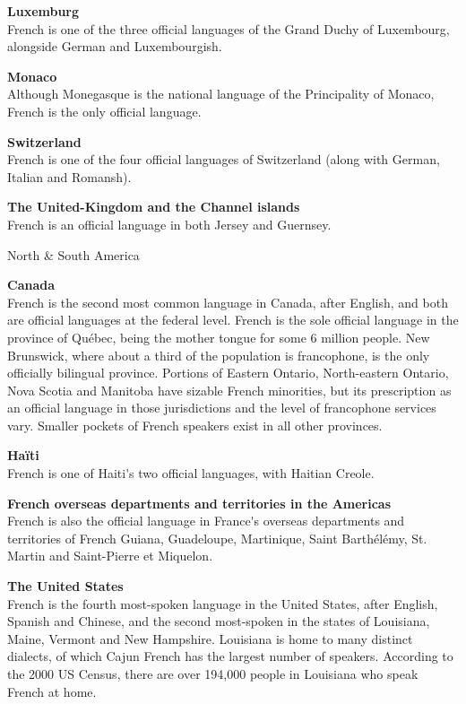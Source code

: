 \begin{multicols}{2}
{\bf Luxemburg}\\
French is one of the three official languages of the Grand Duchy of Luxembourg, alongside German and Luxembourgish.

{\bf Monaco}\\ 
Although Monegasque is the national language of the Principality of
Monaco, French is the only official language.

{\bf Switzerland}\\
French is one of the four official languages of Switzerland (along with German, Italian and Romansh).

{\bf The United-Kingdom and the Channel islands}\\
French is an official language in both Jersey and Guernsey.

\begin{center}
{\sc North \& South America}
\end{center}

{\bf Canada}\\
French is the second most common language in Canada, after English,
and both are official languages at the federal level. French is the
sole official language in the province of Québec, being the mother
tongue for some 6 million people. New Brunswick, where about a third
of the population is francophone, is the only officially bilingual
province. Portions of Eastern Ontario, North-eastern Ontario, Nova
Scotia and Manitoba have sizable French minorities, but its
prescription as an official language in those jurisdictions and the
level of francophone services vary. Smaller pockets of French speakers
exist in all other provinces.

{\bf Haïti}\\
French is one of Haiti{\mbox '}s two official languages, with Haitian Creole. 

{\bf French overseas departments and territories in the Americas}\\
French is also the official language in France{\mbox '}s overseas departments and territories of French Guiana, Guadeloupe, Martinique, Saint Barthélémy, St. Martin and Saint-Pierre et Miquelon.

{\bf The United States }\\
French is the fourth most-spoken language in the United States, after
English, Spanish and Chinese, and the second most-spoken in the states
of Louisiana, Maine, Vermont and New Hampshire. Louisiana is home to
many distinct dialects, of which Cajun French has the largest number
of speakers. According to the 2000 US Census, there are over 194,000
people in Louisiana who speak French at home.


\end{multicols}
